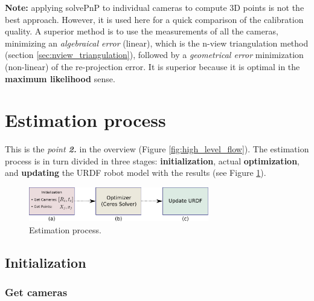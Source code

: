 \noindent
\textbf{Note:} applying solvePnP to individual cameras to compute 3D points is not the best approach. However, it is used here for a quick comparison of the calibration quality. A superior method is to use the measurements of all the cameras, minimizing an \textit{algebraical error} (linear), which is the n-view triangulation method (section \ref{sec:nview_triangulation}), followed by a \textit{geometrical error} minimization (non-linear) of the re-projection error. It is superior because it is optimal in the \textbf{maximum likelihood} sense.

\section{Estimation process}
\label{sec:estimation}

This is the \textit{point \textbf{2.}} in the overview (Figure \ref{fig:high_level_flow}).
The estimation process is in turn divided in three stages: \textbf{initialization}, actual \textbf{optimization}, and \textbf{updating} the URDF robot model with the results (see Figure \ref{fig:optimization}).

\begin{figure}[!htbp]
 \centering
 \includegraphics[width=0.7\textwidth]{images/optimization.pdf}
 \caption{Estimation process.}
 \label{fig:optimization}
\end{figure}

%


\subsection{Initialization}
\label{sec:initialization}

\subsubsection*{Get cameras}

